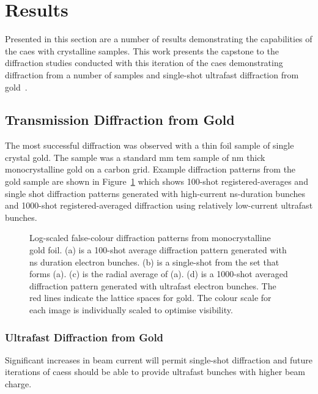 \section{Results}

Presented in this section are a number of results demonstrating the capabilities of the \gls{caes} with crystalline samples.
This work presents the capstone to the diffraction studies conducted with this iteration of the \gls{caes} demonstrating diffraction from a number of samples and single-shot ultrafast diffraction from gold~\cite{speirs_single-shot_2015}.

\subsection{Transmission Diffraction from Gold}

The most successful diffraction was observed with a thin foil sample of single crystal gold.
The sample was a standard \unit[3]{mm} \gls{tem} sample of \unit[11]{nm} thick monocrystalline gold on a carbon grid.
Example diffraction patterns from the gold sample are shown in Figure~\ref{figure:au_diffraction} which shows 100-shot registered-averages and single shot diffraction patterns generated with high-current ns-duration bunches and 1000-shot registered-averaged diffraction using relatively low-current ultrafast bunches.

\begin{figure}
    \center
    
    \caption[Diffraction patterns from gold.]{Log-scaled false-colour diffraction patterns from monocrystalline gold foil. (a) is a 100-shot average diffraction pattern generated with ns duration electron bunches. (b) is a single-shot from the set that forms (a). (c) is the radial average of (a). (d) is a 1000-shot averaged diffraction pattern generated with ultrafast electron bunches. The red lines indicate the lattice spaces for gold. The colour scale for each image is individually scaled to optimise visibility.}
    \label{figure:au_diffraction}
\end{figure}

\subsubsection{Ultrafast Diffraction from Gold}

Significant increases in beam current will permit single-shot diffraction and future iterations of \glspl{caes} should be able to provide ultrafast bunches with higher beam charge.

